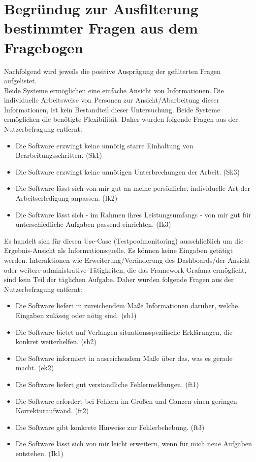 \section{Begründug zur Ausfilterung bestimmter Fragen aus dem Fragebogen \textcolor{red}{\cite{http://www.uselab.tu-berlin.de/wiki/images/6/62/ISONorm_Kurzversion.pdf}}}
\label{Add:Nutzerbefragung_Prümper:Begründung_Filterung}

Nachfolgend wird jeweils die positive Ausprägung der gefilterten Fragen aufgelistet.\\

\noindent
Beide Systeme ermöglichen eine einfache Ansicht von Informationen. Die individuelle Arbeitsweise von Personen zur Ansicht/Abarbeitung dieser Informationen, ist kein Bestandteil dieser Untersuchung.
Beide Systeme ermöglichen die benötigte Flexibilität. Daher wurden folgende Fragen aus der Nutzerbefragung entfernt:
\begin{itemize}
    \item Die Software erzwingt keine unnötig starre Einhaltung von Bearbeitungsschritten. (Sk1) %
    \item Die Software erzwingt keine unnötigen Unterbrechungen der Arbeit. (Sk3) %
    \item Die Software lässt sich von mir gut an meine persönliche, individuelle Art der Arbeitserledigung anpassen. (Ik2) %
    \item Die Software lässt sich - im Rahmen ihres Leistungsumfangs - von mir gut für unterschiedliche Aufgaben passend einrichten. (Ik3) %
\end{itemize}

\noindent
Es handelt sich für diesen Use-Case (Testpoolmonitoring) ausschließlich um die Ergebnis-Ansicht als Informationsquelle. Es können keine Eingaben getätigt werden. Interaktionen wie Erweiterung/Veränderung des Dashboards/der Ansicht oder weitere administrative Tätigkeiten, die das Framework Grafana ermöglicht, sind kein Teil der täglichen Aufgabe. Daher wurden folgende Fragen aus der Nutzerbefragung entfernt:
\begin{itemize}
    \item Die Software liefert in zureichendem Maße Informationen darüber, welche Eingaben zulässig oder nötig sind. (sb1) %
    \item Die Software bietet auf Verlangen situationsspezifische Erklärungen, die konkret weiterhelfen. (sb2) %
    \item Die Software informiert in ausreichendem Maße über das, was es gerade macht. (ek2) %
    \item Die Software liefert gut verständliche Fehlermeldungen. (ft1) %
    \item Die Software erfordert bei Fehlern im Großen und Ganzen einen geringen Korrekturaufwand. (ft2) %
    \item Die Software gibt konkrete Hinweise zur Fehlerbehebung. (ft3) %
    \item Die Software lässt sich von mir leicht erweitern, wenn für mich neue Aufgaben entstehen. (Ik1) %
\end{itemize}

